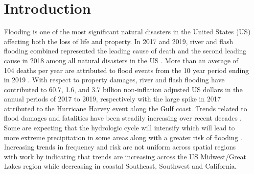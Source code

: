 \section{Introduction}
%
Flooding is one of the most significant natural disasters in the United States (US) affecting both the loss of life and property. 
In 2017 and 2019, river and flash flooding combined represented the leading cause of death and the second leading cause in 2018 among all natural disasters in the US \cite{national_weather_service_2020,national_weather_service_2019,national_weather_service_2018}. 
More than an average of 104 deaths per year are attributed to flood events from the 10 year period ending in 2019 \cite{us_department_of_commerce_2020}. 
With respect to property damages, river and flash flooding have contributed to 60.7, 1.6, and 3.7 billion non-inflation adjusted US dollars in the annual periods of 2017 to 2019, respectively \cite{national_weather_service_2020,national_weather_service_2019,national_weather_service_2018} with the large spike in 2017 attributed to the Hurricane Harvey event along the Gulf coast. 
Trends related to flood damages and fatalities have been steadily increasing over recent decades \cite{mallakpour2015changing,downton2005reanalysis,kunkel1999temporal,pielke2000precipitation,corringham2019effect}. 
Some are expecting that the hydrologic cycle will intensify which will lead to more extreme precipitation in some areas along with a greater risk of flooding \cite{tabari2020climate,milly2002increasing,wing2018estimates}. 
Increasing trends in frequency and risk are not uniform across spatial regions with work by  indicating that trends are increasing across the US Midwest/Great Lakes region while decreasing in coastal Southeast, Southwest and California.
%
